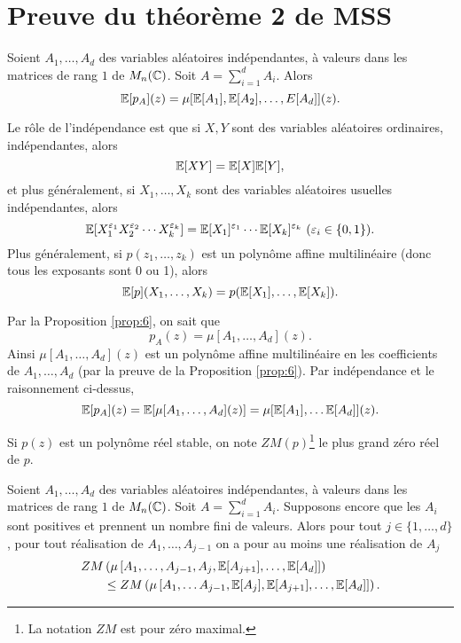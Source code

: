 \section{Preuve du théorème 2 de MSS}
\label{sec:preuve-du-theoreme2}

\begin{lem}
  \label{lem:7}
  Soient $A_1, \ldots, A_d$ des variables aléatoires indépendantes, à valeurs dans les matrices de rang $1$ de
  $M_n(\mathbb{C})$. Soit $A = \sum_{i = 1}^{d} A_i$. Alors 
  \[ \mathbb{E}[p_A](z) = \mu[\mathbb{E}[A_1], \mathbb{E}[A_2], \ldots, E[A_d]](z). \]
\end{lem}

Le rôle de l'indépendance est que si $X, Y$ sont des variables aléatoires ordinaires, indépendantes, alors 
\[ \mathbb{E}[XY] = \mathbb{E}[X]\mathbb{E}[Y], \]
et plus généralement, si $X_1, \ldots , X_k$ sont des variables aléatoires usuelles indépendantes, alors 
\[ \mathbb{E}[X_1^{\varepsilon_1} X_2^{\varepsilon_2} \cdots X_k^{\varepsilon_k}] = \mathbb{E}[X_1]^{\varepsilon_1} \cdots
  \mathbb{E}[X_k]^{\varepsilon_k}\ (\varepsilon_i \in \{0,1\}). \]
Plus généralement, si $p(z_1, \ldots , z_k)$ est un polynôme affine multilinéaire (donc tous les exposants
sont 0 ou 1), alors 
\[ \mathbb{E}[p](X_1, \ldots , X_k) = p(\mathbb{E}[X_1], \ldots , \mathbb{E}[X_k]). \]

\begin{preuve}
  Par la Proposition \ref{prop:6}, on sait que 
  \[ p_A(z) = \mu[A_1, \ldots , A_d](z). \]
  Ainsi $\mu[A_1, \ldots , A_d](z)$ est un polynôme affine multilinéaire en les coefficients de $A_1, \ldots ,
  A_d$ (par la preuve de la Proposition \ref{prop:6}). Par indépendance et le raisonnement ci-dessus, 
  \[ \mathbb{E}[p_A](z) = \mathbb{E}[\mu[A_1, \ldots , A_d](z)] = \mu[\mathbb{E}[A_1], \ldots \mathbb{E}[A_d]](z). \]
\end{preuve}


Si $p(z)$ est un polynôme réel stable, on note $ZM(p)$\footnote{La notation $ZM$ est pour \og zéro
  maximal\fg{}.} le plus grand zéro réel de $p$.


\begin{lem}
  \label{lem:8}
  Soient $A_1, \ldots, A_d$ des variables aléatoires indépendantes, à valeurs dans les matrices de rang $1$ de
  $M_n(\mathbb{C})$. Soit $A = \sum_{i = 1}^{d} A_i$. Supposons encore que les $A_i$ sont positives et prennent un
  nombre fini de valeurs. Alors pour tout $j \in \{1, \ldots , d\}$, pour tout réalisation de $A_1, \ldots ,
  A_{j-1}$ on a pour au moins une réalisation de $A_j$ 
  \begin{align*}
    ZM&\left( \mu\left[A_1, \ldots , A_{j-1}, A_j, \mathbb{E}[A_{j+1}], \ldots , \mathbb{E}[A_d]\right] \right) \\
    &\leq ZM \left(
    \mu \left[ A_1, \ldots A_{j-1}, \mathbb{E}[A_j],  \mathbb{E}[A_{j+1}], \ldots , \mathbb{E}[A_d]\right] \right).
  \end{align*}
\end{lem}

